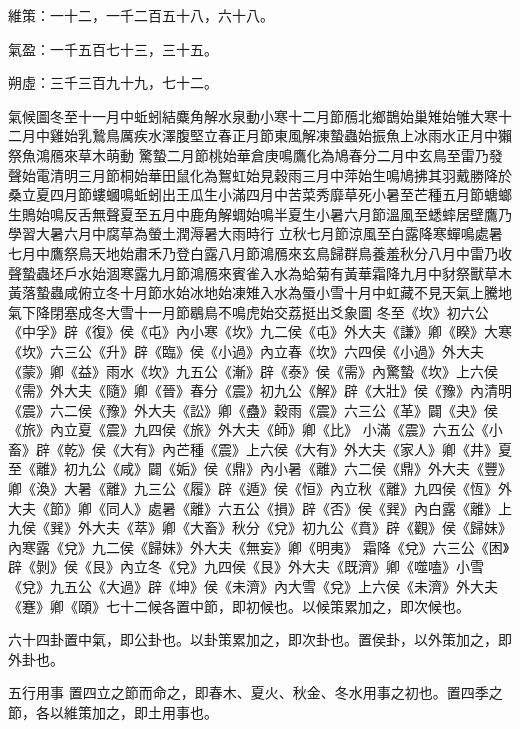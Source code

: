 \begin{pinyinscope}
 維策：一十二，一千二百五十八，六十八。



 氣盈：一千五百七十三，三十五。



 朔虛：三千三百九十九，七十二。



 氣候圖冬至十一月中蚯蚓結麋角解水泉動小寒十二月節鴈北鄉鵲始巢雉始雊大寒十二月中雞始乳鷙鳥厲疾水澤腹堅立春正月節東風解凍蟄蟲始振魚上冰雨水正月中獺祭魚鴻鴈來草木萌動
 驚蟄二月節桃始華倉庚鳴鷹化為鳩春分二月中玄鳥至雷乃發聲始電清明三月節桐始華田鼠化為鴽虹始見穀雨三月中萍始生鳴鳩拂其羽戴勝降於桑立夏四月節螻蟈鳴蚯蚓出王瓜生小滿四月中苦菜秀靡草死小暑至芒種五月節螗螂生鵙始鳴反舌無聲夏至五月中鹿角解蜩始鳴半夏生小暑六月節溫風至蟋蟀居壁鷹乃學習大暑六月中腐草為螢土潤溽暑大雨時行
 立秋七月節涼風至白露降寒蟬鳴處暑七月中鷹祭鳥天地始肅禾乃登白露八月節鴻鴈來玄鳥歸群鳥養羞秋分八月中雷乃收聲蟄蟲坯戶水始涸寒露九月節鴻鴈來賓雀入水為蛤菊有黃華霜降九月中豺祭獸草木黃落蟄蟲咸俯立冬十月節水始冰地始凍雉入水為蜃小雪十月中虹藏不見天氣上騰地氣下降閉塞成冬大雪十一月節鶡鳥不鳴虎始交荔挺出爻象圖
 冬至《坎》初六公《中孚》辟《復》侯《屯》內小寒《坎》九二侯《屯》外大夫《謙》卿《睽》大寒《坎》六三公《升》辟《臨》侯《小過》內立春《坎》六四侯《小過》外大夫《蒙》卿《益》雨水《坎》九五公《漸》辟《泰》侯《需》內驚蟄《坎》上六侯《需》外大夫《隨》卿《晉》春分《震》初九公《解》辟《大壯》侯《豫》內清明《震》六二侯《豫》外大夫《訟》卿《蠱》穀雨《震》六三公《革》闢《夬》侯《旅》內立夏《震》九四侯《旅》外大夫《師》卿《比》
 小滿《震》六五公《小畜》辟《乾》侯《大有》內芒種《震》上六侯《大有》外大夫《家人》卿《井》夏至《離》初九公《咸》闢《姤》侯《鼎》內小暑《離》六二侯《鼎》外大夫《豐》卿《渙》大暑《離》九三公《履》辟《遁》侯《恒》內立秋《離》九四侯《恆》外大夫《節》卿《同人》處暑《離》六五公《損》辟《否》侯《巽》內白露《離》上九侯《巽》外大夫《萃》卿《大畜》秋分《兌》初九公《賁》辟《觀》侯《歸妹》內寒露《兌》九二侯《歸妹》外大夫《無妄》卿《明夷》
 霜降《兌》六三公《困》辟《剝》侯《艮》內立冬《兌》九四侯《艮》外大夫《既濟》卿《噬嗑》小雪《兌》九五公《大過》辟《坤》侯《未濟》內大雪《兌》上六侯《未濟》外大夫《蹇》卿《頤》七十二候各置中節，即初候也。以候策累加之，即次候也。



 六十四卦置中氣，即公卦也。以卦策累加之，即次卦也。置侯卦，以外策加之，即外卦也。



 五行用事
 置四立之節而命之，即春木、夏火、秋金、冬水用事之初也。置四季之節，各以維策加之，即土用事也。




\end{pinyinscope}
